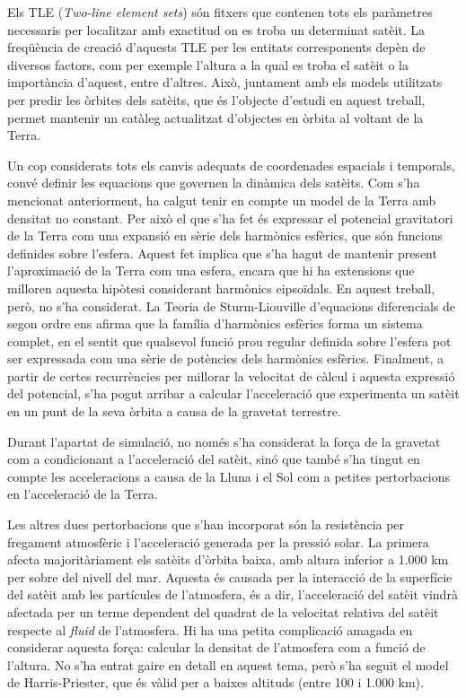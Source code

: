 \documentclass{article}
\begin{document}
Els TLE (\emph{Two-line element sets}) són fitxers que contenen tots els paràmetres necessaris per localitzar amb exactitud on es troba un determinat satè\lgem it. La freqüència de creació d'aquests TLE per les entitats corresponents depèn de diversos factors, com per exemple l'altura a la qual es troba el satè\lgem it o la importància d'aquest, entre d'altres. Això, juntament amb els models utilitzats per predir les òrbites dels satè\lgem its, que és l'objecte d'estudi en aquest treball, permet mantenir un catàleg actualitzat d'objectes en òrbita al voltant de la Terra.

Un cop considerats tots els canvis adequats de coordenades espacials i temporals, convé definir les equacions que governen la dinàmica dels satè\lgem its. Com s'ha mencionat anteriorment, ha calgut tenir en compte un model de la Terra amb densitat no constant. Per això el que s'ha fet és expressar el potencial gravitatori de la Terra com una expansió en sèrie dels harmònics esfèrics, que són funcions definides sobre l'esfera. Aquest fet implica que s'ha hagut de mantenir present l'aproximació de la Terra com una esfera, encara que hi ha extensions que milloren aquesta hipòtesi considerant harmònics e\lgem ipsoïdals. En aquest treball, però, no s'ha  considerat. La Teoria de Sturm-Liouville d'equacions diferencials de segon ordre ens afirma que la família d'harmònics esfèrics forma un sistema complet, en el sentit que qualsevol funció prou regular definida sobre l'esfera pot ser expressada com una sèrie de potències dels harmònics esfèrics. Finalment, a partir de certes recurrències per millorar la velocitat de càlcul i aquesta expressió del potencial, s'ha pogut arribar a calcular l'acceleració que experimenta un satè\lgem it en un punt de la seva òrbita a causa de la gravetat terrestre.

Durant l'apartat de simulació, no només s'ha considerat la força de la gravetat com a condicionant a l'acceleració del satè\lgem it, sinó que també s'ha tingut en compte les acceleracions a causa de la Lluna i el Sol com a petites pertorbacions en l'acceleració de la Terra.

Les altres dues pertorbacions que s'han incorporat són la resistència per fregament atmosfèric i l'acceleració generada per la pressió solar. La primera afecta majoritàriament els satè\lgem its d'òrbita baixa, amb altura inferior a 1.000 km per sobre del nivell del mar. Aquesta és causada per la interacció de la superfície del satè\lgem it amb les partícules de l'atmosfera, és a dir, l'acceleració del satè\lgem it vindrà afectada per un terme dependent del quadrat de la velocitat relativa del satè\lgem it respecte al \emph{fluid} de l'atmosfera. Hi ha una petita complicació amagada en considerar aquesta força: calcular la densitat de l'atmosfera com a funció de l'altura. No s'ha entrat gaire en detall en aquest tema, però s'ha seguit el model de Harris-Priester, que és vàlid per a baixes altituds (entre 100 i 1.000 km).
\end{document}

